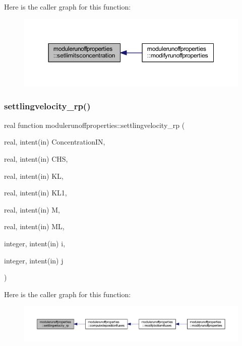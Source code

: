 Here is the caller graph for this function\+:\nopagebreak
\begin{figure}[H]
\begin{center}
\leavevmode
\includegraphics[width=350pt]{namespacemodulerunoffproperties_aa9620af1c193dc89f2ab50f709f50f32_icgraph}
\end{center}
\end{figure}
\mbox{\label{namespacemodulerunoffproperties_a319ef0d7c134a22fa402d33b27472388}} 
\subsubsection{\texorpdfstring{settlingvelocity\+\_\+rp()}{settlingvelocity\_rp()}}
{\footnotesize\ttfamily real function modulerunoffproperties\+::settlingvelocity\+\_\+rp (\begin{DoxyParamCaption}\item[{real, intent(in)}]{Concentration\+IN,  }\item[{real, intent(in)}]{C\+HS,  }\item[{real, intent(in)}]{KL,  }\item[{real, intent(in)}]{K\+L1,  }\item[{real, intent(in)}]{M,  }\item[{real, intent(in)}]{ML,  }\item[{integer, intent(in)}]{i,  }\item[{integer, intent(in)}]{j }\end{DoxyParamCaption})\hspace{0.3cm}{\ttfamily [private]}}

Here is the caller graph for this function\+:\nopagebreak
\begin{figure}[H]
\begin{center}
\leavevmode
\includegraphics[width=350pt]{namespacemodulerunoffproperties_a319ef0d7c134a22fa402d33b27472388_icgraph}
\end{center}
\end{figure}
\mbox{\label{namespacemodulerunoffproperties_a63a750ecc17b3e0301717d8bc71858f2}} 
